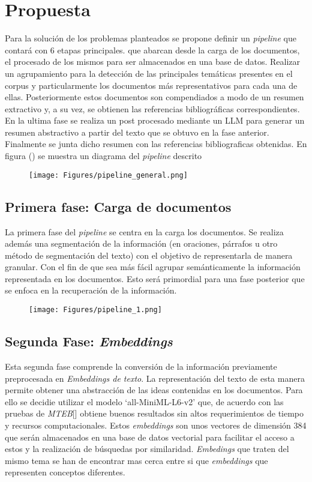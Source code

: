 \chapter{Propuesta}\label{chapter:proposal}
    Para la solución de los problemas planteados se propone definir un \emph{pipeline} que contará con 6 etapas principales.
    que abarcan desde la carga de los documentos, el procesado de los mismos para ser almacenados en una base de datos. Realizar un agrupamiento para la detección de las principales temáticas presentes en el corpus y particularmente los documentos más representativos para cada una de ellas. Posteriormente estos documentos son compendiados a modo de un resumen extractivo y, a su vez, se obtienen las referencias bibliográficas correspondientes. En la ultima fase se realiza un post procesado mediante un LLM para generar un resumen abstractivo a partir del texto que se obtuvo en la fase anterior. Finalmente se junta dicho resumen con las referencias bibliograficas obtenidas. En figura () se muestra un diagrama del \emph{pipeline} descrito

    \begin{figure}[H]    
        \centering
        \texttt{[image: Figures/pipeline\_general.png]}
        \caption*{}
    \end{figure}
    

    \section{Primera fase: Carga de documentos} 
    La primera fase del \emph{pipeline} se centra en la carga los documentos. Se realiza además una segmentación de la información (en oraciones, párrafos u otro método de segmentación del texto) con el objetivo de representarla de manera granular. Con el fin de que sea más fácil agrupar semánticamente la información representada en los documentos. Esto será primordial para una fase posterior que se enfoca en la recuperación de la información.

    \begin{figure}[H]    
        \centering
        \texttt{[image: Figures/pipeline\_1.png]}
        \caption*{}
    \end{figure}
    
    \section{Segunda Fase: \emph{Embeddings}}
    Esta segunda fase comprende la conversión de la información previamente preprocesada en \emph{Embeddings de texto}.
    La representación del texto de esta manera permite obtener una abstracción de las ideas contenidas en los documentos. 
    Para ello se decidie utilizar el modelo `all-MiniML-L6-v2' que, de acuerdo con las pruebas de \emph{MTEB}[\cite{leaderboard}] obtiene buenos resultados sin altos requerimientos de tiempo y recursos computacionales. Estos \emph{embeddings} son unos vectores de dimensión 384 que serán almacenados en una base de datos vectorial para facilitar el acceso a estos y la realización de búsquedas por similaridad. \emph{Embedings} que traten del mismo tema se han de encontrar mas cerca entre si que \emph{embeddings} que representen conceptos diferentes.

